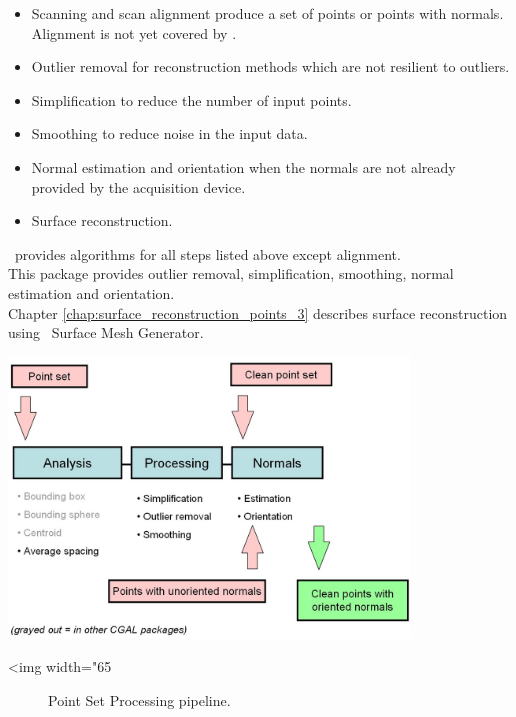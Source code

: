 \begin{itemize}
\item Scanning and scan alignment produce a set of points
      or points with normals. Alignment is not yet
      covered by \cgal.
\item Outlier removal for reconstruction methods which
      are not resilient to outliers.
\item Simplification to reduce the number of input points.
\item Smoothing to reduce noise in the input data.
\item Normal estimation and orientation when the normals
      are not already provided by the acquisition device.
\item Surface reconstruction.
\end{itemize}

\cgal\ provides algorithms for all steps listed above except alignment.\\
This package provides outlier removal, simplification, smoothing,
normal estimation and orientation.\\
Chapter  \ref{chap:surface_reconstruction_points_3}
describes surface reconstruction using \cgal\ Surface Mesh Generator.

\begin{center}
    \label{Point_set_processing_3-fig-pipeline}
    \begin{ccTexOnly}
        \includegraphics[width=0.8\textwidth]{Point_set_processing_3/pipeline} %
    \end{ccTexOnly}
    \begin{ccHtmlOnly}
        <img width="65%
    \end{ccHtmlOnly}
    \begin{figure}[h]
        \caption{Point Set Processing pipeline.}
    \end{figure}
\end{center}


